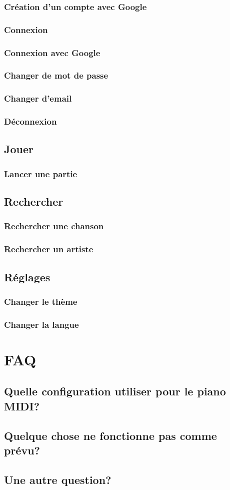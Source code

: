 \documentclass[a4paper, 12pt]{article}
\begin{document}
\subsubsection{Création d'un compte avec Google}
\subsubsection{Connexion}
\subsubsection{Connexion avec Google}
\subsubsection{Changer de mot de passe}
\subsubsection{Changer d'email}
\subsubsection{Déconnexion}
\subsection{Jouer}
\subsubsection{Lancer une partie}
\subsection{Rechercher}
\subsubsection{Rechercher une chanson}
\subsubsection{Rechercher un artiste}
\subsection{Réglages}
\subsubsection{Changer le thème}
\subsubsection{Changer la langue}
\section{FAQ}
\subsection{Quelle configuration utiliser pour le piano MIDI?}
\subsection{Quelque chose ne fonctionne pas comme prévu?}
\subsection{Une autre question?}
\end{document}
